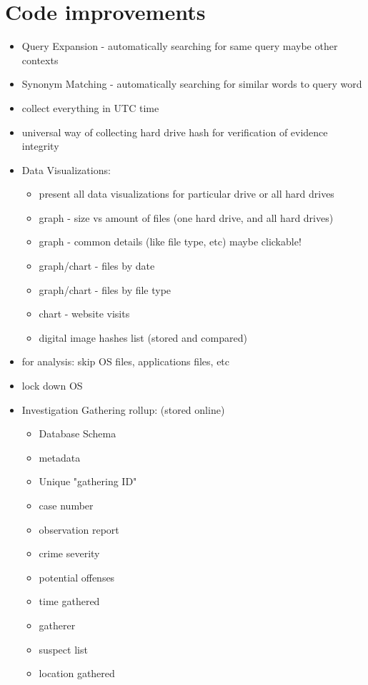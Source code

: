 \documentclass[12pt]{article}
\begin{document}
\newpage
\section{Code improvements}
\begin{itemize}
  \item Query Expansion - automatically searching for same query maybe other contexts
  \item Synonym Matching - automatically searching for similar words to query word
  \item collect everything in UTC time
  \item universal way of collecting hard drive hash for verification of evidence integrity
  \item Data Visualizations:
  \begin{itemize}
    \item present all data visualizations for particular drive or all hard drives
    \item graph - size vs amount of files (one hard drive, and all hard drives)
    \item graph - common details (like file type, etc) maybe clickable!
    \item graph/chart - files by date
    \item graph/chart - files by file type
    \item chart - website visits
    \item digital image hashes list (stored and compared)
  \end{itemize}
  \item for analysis: skip OS files, applications files, etc
  \item lock down OS
  \item Investigation Gathering rollup: (stored online)
  \begin{itemize}
    \item Database Schema
    \item metadata
    \item Unique "gathering ID"
    \item case number
    \item observation report
    \item crime severity
    \item potential offenses
    \item time gathered
    \item gatherer
    \item suspect list
    \item location gathered

\end{itemize}
\end{itemize}
\end{document}

